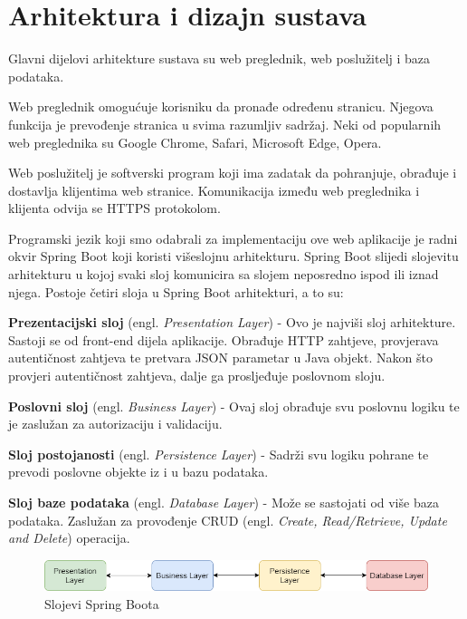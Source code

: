 \chapter{Arhitektura i dizajn sustava}

		Glavni dijelovi arhitekture sustava su web preglednik, web poslužitelj i baza podataka.  
		
		Web preglednik omogućuje korisniku da pronađe određenu stranicu. Njegova funkcija je prevođenje stranica u svima razumljiv sadržaj. Neki od popularnih web preglednika su Google Chrome, Safari, Microsoft Edge, Opera. 
		
		Web poslužitelj je softverski program koji ima zadatak da pohranjuje, obrađuje i dostavlja klijentima web stranice. Komunikacija između web preglednika i klijenta odvija se HTTPS protokolom. 
		
		Programski jezik koji smo odabrali za implementaciju ove web aplikacije je radni okvir Spring Boot koji koristi višeslojnu arhitekturu. Spring Boot slijedi slojevitu arhitekturu u kojoj svaki sloj komunicira sa slojem neposredno ispod ili iznad njega. Postoje četiri sloja u Spring Boot arhitekturi, a to su: 
		
		\begin{packed_item}
			\item \textbf{Prezentacijski sloj} (engl. \textit{Presentation Layer}) - Ovo je najviši sloj arhitekture. Sastoji se od front-end dijela aplikacije. Obrađuje HTTP zahtjeve, provjerava autentičnost zahtjeva te pretvara JSON parametar u Java objekt. Nakon što provjeri autentičnost zahtjeva, dalje ga prosljeđuje poslovnom sloju.
			\item \textbf{Poslovni sloj} (engl. \textit{Business Layer}) - Ovaj sloj obrađuje svu poslovnu logiku te je zaslužan za autorizaciju i validaciju.
			\item \textbf{Sloj postojanosti} (engl. \textit{Persistence Layer}) - Sadrži svu logiku pohrane te prevodi poslovne objekte iz i u bazu podataka.
			\item \textbf{Sloj baze podataka} (engl. \textit{Database Layer}) - Može se sastojati od više baza podataka. Zaslužan za provođenje CRUD (engl. \textit{Create, Read/Retrieve, Update and Delete}) operacija.
		\end{packed_item}
	
		\begin{figure}[H]
			\includegraphics[scale=0.57]{slike/slojevi.png}
			\centering
			\caption{Slojevi Spring Boota}
			\label{fig:slojevi}
		\end{figure}
	
